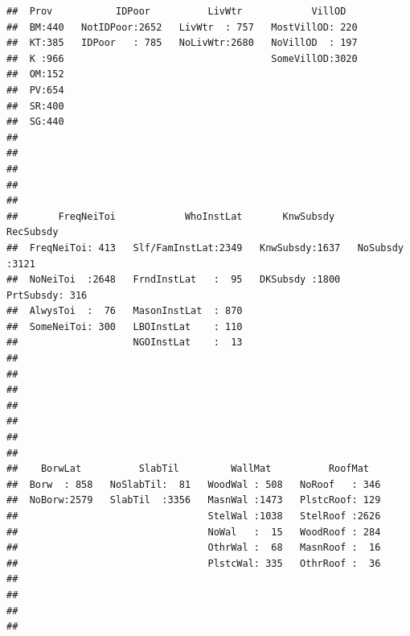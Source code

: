 \documentclass[11pt,]{article}
\begin{document}
\begin{verbatim}
##  Prov           IDPoor          LivWtr            VillOD    
##  BM:440   NotIDPoor:2652   LivWtr  : 757   MostVillOD: 220  
##  KT:385   IDPoor   : 785   NoLivWtr:2680   NoVillOD  : 197  
##  K :966                                    SomeVillOD:3020  
##  OM:152                                                     
##  PV:654                                                     
##  SR:400                                                     
##  SG:440                                                     
##                                                             
##                                                             
##                                                             
##                                                             
##                                                             
##       FreqNeiToi            WhoInstLat       KnwSubsdy        RecSubsdy   
##  FreqNeiToi: 413   Slf/FamInstLat:2349   KnwSubsdy:1637   NoSubsdy :3121  
##  NoNeiToi  :2648   FrndInstLat   :  95   DKSubsdy :1800   PrtSubsdy: 316  
##  AlwysToi  :  76   MasonInstLat  : 870                                    
##  SomeNeiToi: 300   LBOInstLat    : 110                                    
##                    NGOInstLat    :  13                                    
##                                                                           
##                                                                           
##                                                                           
##                                                                           
##                                                                           
##                                                                           
##                                                                           
##    BorwLat          SlabTil         WallMat          RoofMat    
##  Borw  : 858   NoSlabTil:  81   WoodWal : 508   NoRoof   : 346  
##  NoBorw:2579   SlabTil  :3356   MasnWal :1473   PlstcRoof: 129  
##                                 StelWal :1038   StelRoof :2626  
##                                 NoWal   :  15   WoodRoof : 284  
##                                 OthrWal :  68   MasnRoof :  16  
##                                 PlstcWal: 335   OthrRoof :  36  
##                                                                 
##                                                                 
##                                                                 
##                                                                 

\end{verbatim}
\end{document}
